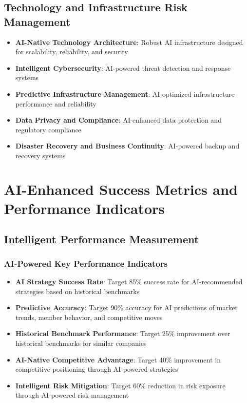 \subsection{Technology and Infrastructure Risk Management}

\begin{itemize}
    \item \textbf{AI-Native Technology Architecture}: Robust AI infrastructure designed for scalability, reliability, and security
    \item \textbf{Intelligent Cybersecurity}: AI-powered threat detection and response systems
    \item \textbf{Predictive Infrastructure Management}: AI-optimized infrastructure performance and reliability
    \item \textbf{Data Privacy and Compliance}: AI-enhanced data protection and regulatory compliance
    \item \textbf{Disaster Recovery and Business Continuity}: AI-powered backup and recovery systems
\end{itemize}

\section{AI-Enhanced Success Metrics and Performance Indicators}

\subsection{Intelligent Performance Measurement}

\subsubsection{AI-Powered Key Performance Indicators}

\begin{itemize}
    \item \textbf{AI Strategy Success Rate}: Target 85\% success rate for AI-recommended strategies based on historical benchmarks
    \item \textbf{Predictive Accuracy}: Target 90\% accuracy for AI predictions of market trends, member behavior, and competitive moves
    \item \textbf{Historical Benchmark Performance}: Target 25\% improvement over historical benchmarks for similar companies
    \item \textbf{AI-Native Competitive Advantage}: Target 40\% improvement in competitive positioning through AI-powered strategies
    \item \textbf{Intelligent Risk Mitigation}: Target 60\% reduction in risk exposure through AI-powered risk management
\end{itemize}

